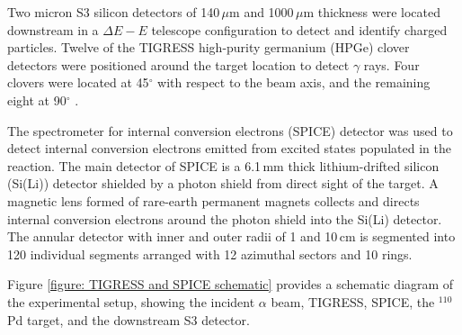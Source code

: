 Two micron S3 silicon detectors of 140\,$\mu$m and 1000\,$\mu$m thickness were located downstream in a $\Delta E-E$ telescope configuration to detect and identify charged particles. Twelve of the TIGRESS high-purity germanium (HPGe) clover detectors were positioned around the target location to detect $\gamma$ rays. Four clovers were located at 45$^{\circ}$ with respect to the beam axis, and the remaining eight at 90$^{\circ}$ \cite{Hackman14}.

The spectrometer for internal conversion electrons (SPICE) detector was used to detect internal conversion electrons emitted from excited states populated in the reaction. The main detector of SPICE is a 6.1\,mm thick lithium-drifted silicon (Si(Li)) detector shielded by a photon shield from direct sight of the target. A magnetic lens formed of rare-earth permanent magnets collects and directs internal conversion electrons around the photon shield into the Si(Li) detector. The annular detector with inner and outer radii of 1 and 10\,cm is segmented into 120 individual segments arranged with 12 azimuthal sectors and 10 rings.

Figure \ref{figure: TIGRESS and SPICE schematic} provides a schematic diagram of the experimental setup, showing the incident $\alpha$ beam, TIGRESS, SPICE, the $^{110}$Pd target, and the downstream S3 detector.

